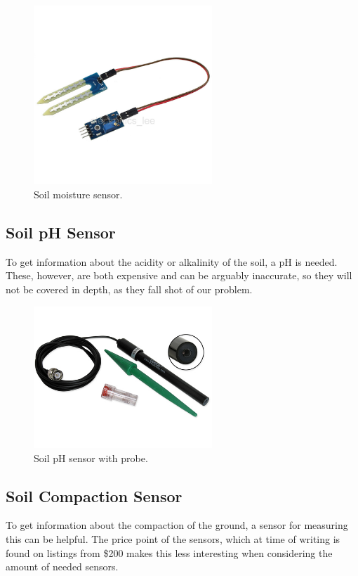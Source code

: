 \begin{figure}[H]\label{moisture_figure}
\centering
\includegraphics[width=0.6\textwidth]{chapters/analysis/figs/soilMoistureSensor.jpg}
\caption{Soil moisture sensor.}
\label{fig:moistureSensor}
\end{figure}



\subsection{Soil pH Sensor}
To get information about the acidity or alkalinity of the soil, a pH is needed. These, however, are both expensive and can be arguably inaccurate, so they will not be covered in depth, as they fall shot of our problem. 

\begin{figure}[H]
\centering
\includegraphics[width=0.6\textwidth]{chapters/analysis/figs/soilPhProbe.jpg}
\caption{Soil pH sensor with probe.}
\label{fig:phSensor}
\end{figure}

\subsection{Soil Compaction Sensor}
To get information about the compaction of the ground, a sensor for measuring this can be helpful. %
The price point of the sensors, which at time of writing is found on listings from \$200 makes this less interesting when considering the amount of needed sensors. %

